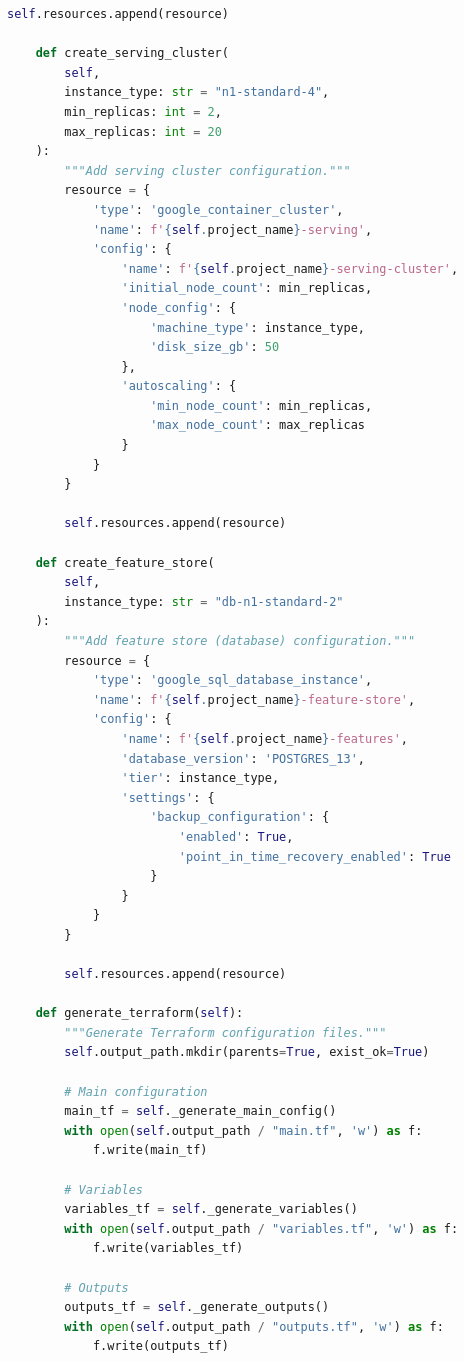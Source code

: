\begin{lstlisting}[language=Python, caption={Terraform Configuration Generator}]
        self.resources.append(resource)

    def create_serving_cluster(
        self,
        instance_type: str = "n1-standard-4",
        min_replicas: int = 2,
        max_replicas: int = 20
    ):
        """Add serving cluster configuration."""
        resource = {
            'type': 'google_container_cluster',
            'name': f'{self.project_name}-serving',
            'config': {
                'name': f'{self.project_name}-serving-cluster',
                'initial_node_count': min_replicas,
                'node_config': {
                    'machine_type': instance_type,
                    'disk_size_gb': 50
                },
                'autoscaling': {
                    'min_node_count': min_replicas,
                    'max_node_count': max_replicas
                }
            }
        }

        self.resources.append(resource)

    def create_feature_store(
        self,
        instance_type: str = "db-n1-standard-2"
    ):
        """Add feature store (database) configuration."""
        resource = {
            'type': 'google_sql_database_instance',
            'name': f'{self.project_name}-feature-store',
            'config': {
                'name': f'{self.project_name}-features',
                'database_version': 'POSTGRES_13',
                'tier': instance_type,
                'settings': {
                    'backup_configuration': {
                        'enabled': True,
                        'point_in_time_recovery_enabled': True
                    }
                }
            }
        }

        self.resources.append(resource)

    def generate_terraform(self):
        """Generate Terraform configuration files."""
        self.output_path.mkdir(parents=True, exist_ok=True)

        # Main configuration
        main_tf = self._generate_main_config()
        with open(self.output_path / "main.tf", 'w') as f:
            f.write(main_tf)

        # Variables
        variables_tf = self._generate_variables()
        with open(self.output_path / "variables.tf", 'w') as f:
            f.write(variables_tf)

        # Outputs
        outputs_tf = self._generate_outputs()
        with open(self.output_path / "outputs.tf", 'w') as f:
            f.write(outputs_tf)


\end{lstlisting}
